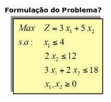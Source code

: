 \documentclass{beamer}
\begin{document}
\begin{frame}
\begin{columns}
\begin{column}{0.6\textwidth}
\begin{equation*}
			\end{equation*}
		\end{column}
		\begin{column}{0.4\textwidth}
			\includegraphics[width=4.5cm,height=4.5cm]{Tabajara_01.png}
		\end{column}
	\end{columns}
\end{frame}
\end{document}
